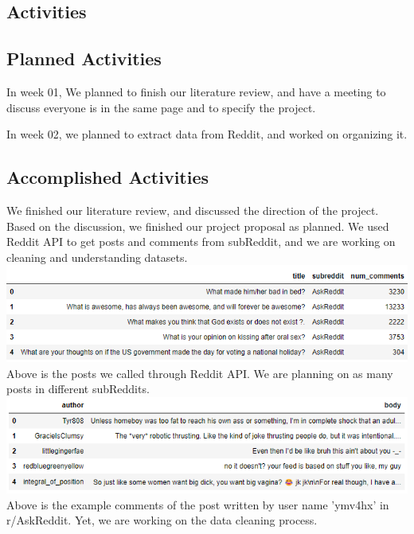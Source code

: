 \documentclass{article}
\begin{document}
\begin{multicols}{2}
\section{Activities}
    \subsection{Planned Activities}
      
    \hspace{5mm}In week 01, We planned to finish our literature review, and have a meeting to discuss everyone is in the same page and to specify the project.
    
    In week 02, we planned to extract data from Reddit, and worked on organizing it.
    \subsection{Accomplished Activities}
    \hspace{5mm}We finished our literature review, and discussed the direction of the project. Based on the discussion, we finished our project proposal as planned. We used Reddit API to get posts and comments from subReddit, and we are working on cleaning and understanding datasets.
    \vspace{3mm}
    \includegraphics[scale=0.49]{dataframe_posts.png}
    \vspace{-10mm}
    \vspace{2mm}
    \hspace{5mm}Above is the posts we called through Reddit API. We are planning on as many posts in different subReddits. 
    \vspace{2mm}
    \includegraphics[scale=0.49]{dataframe_comments.png}
    \vspace{-7mm}
    \vspace{2mm}
    \hspace{5mm}Above is the example comments of the post written by user name 'ymv4hx' in r/AskReddit. Yet, we are working on the data cleaning process.

\end{multicols}
\end{document}
